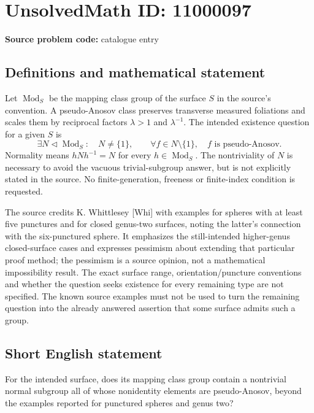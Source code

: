 \documentclass[11pt]{article}
\begin{document}
\section*{UnsolvedMath ID: 11000097}
\textbf{Source problem code:} catalogue entry
\subsection{Definitions and mathematical statement}
Let \(\operatorname{Mod}_S\) be the mapping class group of the surface \(S\) in the source's convention. A pseudo-Anosov class preserves transverse measured foliations and scales them by reciprocal factors \(\lambda>1\) and \(\lambda^{-1}\). The intended existence question for a given \(S\) is
\[
 \exists N\triangleleft\operatorname{Mod}_S:\quad N\ne\{1\},
 \qquad\forall f\in N\setminus\{1\},\quad f\text{ is pseudo-Anosov}.
\]
Normality means \(hNh^{-1}=N\) for every \(h\in\operatorname{Mod}_S\). The nontriviality of \(N\) is necessary to avoid the vacuous trivial-subgroup answer, but is not explicitly stated in the source. No finite-generation, freeness or finite-index condition is requested.

The source credits K. Whittlesey [Whi] with examples for spheres with at least five punctures and for closed genus-two surfaces, noting the latter's connection with the six-punctured sphere. It emphasizes the still-intended higher-genus closed-surface cases and expresses pessimism about extending that particular proof method; the pessimism is a source opinion, not a mathematical impossibility result. The exact surface range, orientation/puncture conventions and whether the question seeks existence for every remaining type are not specified. The known source examples must not be used to turn the remaining question into the already answered assertion that some surface admits such a group.
\subsection{Short English statement}
For the intended surface, does its mapping class group contain a nontrivial normal subgroup all of whose nonidentity elements are pseudo-Anosov, beyond the examples reported for punctured spheres and genus two?
\end{document}

